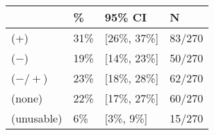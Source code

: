 \begin{tabular}{llll}
\hline
& \% & 95\% CI  & N \\
\hline
(+) & 31\% & [26\%, 37\%] & 83/270\\
($-$) & 19\% & [14\%, 23\%] & 50/270\\
($-/+$) & 23\% & [18\%, 28\%] & 62/270\\
(none) & 22\% & [17\%, 27\%] & 60/270\\
(unusable) & 6\% & [3\%, 9\%] & 15/270\\
\hline
\end{tabular}
